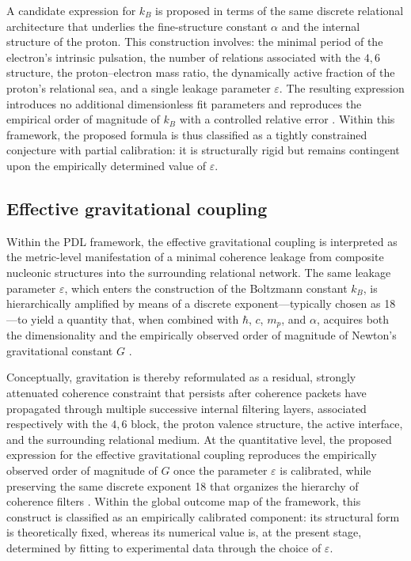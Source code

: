\documentclass[11pt,a4paper]{article}
\begin{document}
A candidate expression for \(k_B\) is proposed in terms of the same discrete relational architecture that underlies the fine-structure constant \(\alpha\) and the internal structure of the proton. This construction involves: the minimal period of the electron’s intrinsic pulsation, the number of relations associated with the \(4,6\) structure, the proton–electron mass ratio, the dynamically active fraction of the proton’s relational sea, and a single leakage parameter \(\varepsilon\). The resulting expression introduces no additional dimensionless fit parameters and reproduces the empirical order of magnitude of \(k_B\) with a controlled relative error
\citep{PDL_Main_2026,Coherence_Leakage_18_2026}. Within this framework, the proposed formula is thus classified as a tightly constrained conjecture with partial calibration: it is structurally rigid but remains contingent upon the empirically determined value of \(\varepsilon\).

\subsection{Effective gravitational coupling}
\label{subsec:gravity_constant}

Within the PDL framework, the effective gravitational coupling is interpreted as the metric-level manifestation of a minimal coherence leakage from composite nucleonic structures into the surrounding relational network. The same leakage parameter \(\varepsilon\), which enters the construction of the Boltzmann constant \(k_B\), is hierarchically amplified by means of a discrete exponent—typically chosen as 18—to yield a quantity that, when combined with \(\hbar\), \(c\), \(m_p\), and \(\alpha\), acquires both the dimensionality and the empirically observed order of magnitude of Newton’s gravitational constant \(G\)
\citep{PDL_Main_2026,Exponent_18_PDL_2026,PDL_position}.

Conceptually, gravitation is thereby reformulated as a residual, strongly attenuated coherence constraint that persists after coherence packets have propagated through multiple successive internal filtering layers, associated respectively with the \(4,6\) block, the proton valence structure, the active interface, and the surrounding relational medium. At the quantitative level, the proposed expression for the effective gravitational coupling reproduces the empirically observed order of magnitude of \(G\) once the parameter \(\varepsilon\) is calibrated, while preserving the same discrete exponent 18 that organizes the hierarchy of coherence filters
\citep{Exponent_18_PDL_2026,Coherence_Leakage_18_2026}. Within the global outcome map of the framework, this construct is classified as an empirically calibrated component: its structural form is theoretically fixed, whereas its numerical value is, at the present stage, determined by fitting to experimental data through the choice of \(\varepsilon\).
\end{document}
